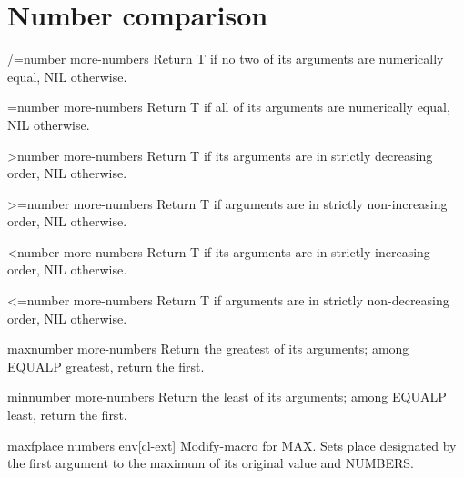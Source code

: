 \documentclass[10pt,english]{book}
\begin{document}
\section{Number comparison}
\label{sec:number-comparison}

\begin{function}{/=}{number \rest more-numbers}
  Return T if no two of its arguments are numerically equal, NIL otherwise.
\end{function}

\begin{function}{=}{number \rest more-numbers}
  Return T if all of its arguments are numerically equal, NIL otherwise.
\end{function}

\begin{function}{>}{number \rest more-numbers}
  Return T if its arguments are in strictly decreasing order, NIL otherwise.
\end{function}

\begin{function}{>=}{number \rest more-numbers}
  Return T if arguments are in strictly non-increasing order, NIL otherwise.
\end{function}

\begin{function}{<}{number \rest more-numbers}
  Return T if its arguments are in strictly increasing order, NIL otherwise.
\end{function}

\begin{function}{<=}{number \rest more-numbers}
  Return T if arguments are in strictly non-decreasing order, NIL otherwise.
\end{function}

\begin{function}{max}{number \rest more-numbers}
  Return the greatest of its arguments; among EQUALP greatest, return
the first.
\end{function}

\begin{function}{min}{number \rest more-numbers}
  Return the least of its arguments; among EQUALP least, return
the first.
\end{function}

\begin{macro}{maxf}{place \rest numbers \env env}[cl-ext]
  Modify-macro for MAX. Sets place designated by the first argument to the
maximum of its original value and NUMBERS.
\end{macro}
\end{document}
